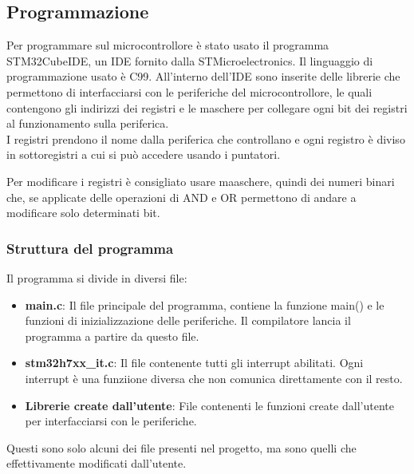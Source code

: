 \pagebreak

\subsection{Programmazione}
Per programmare sul microcontrollore è stato usato il programma STM32CubeIDE, un IDE fornito dalla STMicroelectronics. Il linguaggio di programmazione usato è C99. All'interno dell'IDE sono inserite delle librerie che permettono di interfacciarsi con le periferiche del microcontrollore, le quali contengono gli indirizzi dei registri e le maschere per collegare ogni bit dei registri al funzionamento sulla periferica.\\

I registri prendono il nome dalla periferica che controllano e ogni registro è diviso in sottoregistri a cui si può accedere usando i puntatori.

Per modificare i registri è consigliato usare maaschere, quindi dei numeri binari che, se applicate delle operazioni di AND e OR permettono di andare a modificare solo determinati bit.

\subsubsection{Struttura del programma}
Il programma si divide in diversi file:
\begin{itemize}
    \item \textbf{main.c}: Il file principale del programma, contiene la funzione main() e le funzioni di inizializzazione delle periferiche. Il compilatore lancia il programma a partire da questo file.
    \item \textbf{stm32h7xx_it.c}: Il file contenente tutti gli interrupt abilitati. Ogni interrupt è una funziione diversa che non comunica direttamente con il resto.
    \item \textbf{Librerie create dall'utente}: File contenenti le funzioni create dall'utente per interfacciarsi con le periferiche.
\end{itemize}

Questi sono solo alcuni dei file presenti nel progetto, ma sono quelli che effettivamente modificati dall'utente.



